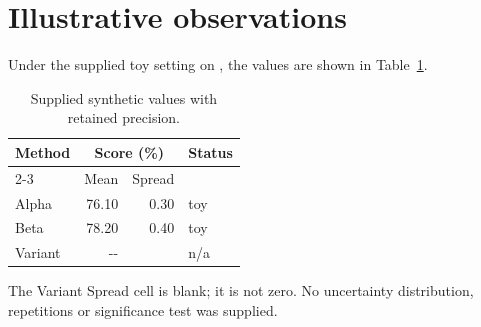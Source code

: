 \section{Illustrative observations}\label{sec:results}
Under the supplied toy setting on \datasetname{}, the values are shown in
Table~\ref{tab:results}. 
\begin{table}[htbp]
\centering\small
\caption{Supplied synthetic values with retained precision.}\label{tab:results}
\begin{tabular}{@{}lrrl@{}}
\toprule
Method & \multicolumn{2}{c}{Score (\%)} & Status\\
\cmidrule(lr){2-3}
& Mean & Spread &\\
\midrule
Alpha & 76.10 & 0.30 & toy\\
Beta & 78.20 & 0.40 & toy\\
Variant & -{}- & & n/a\\
\bottomrule
\end{tabular}
\end{table}
The Variant Spread cell is blank; it is not zero.
No uncertainty distribution, repetitions or significance test was supplied.
